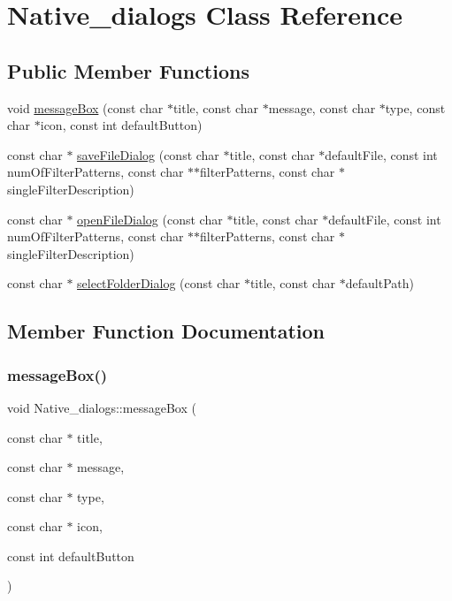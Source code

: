 \hypertarget{class_native__dialogs}{}\section{Native\+\_\+dialogs Class Reference}
\label{class_native__dialogs}
\subsection*{Public Member Functions}
\begin{DoxyCompactItemize}
\item 
void \hyperlink{class_native__dialogs_a325b62ac200ee9d8287a7320643d5385}{message\+Box} (const char $\ast$title, const char $\ast$message, const char $\ast$type, const char $\ast$icon, const int default\+Button)
\item 
const char $\ast$ \hyperlink{class_native__dialogs_a4bf815830a674dc34903d272391bcac3}{save\+File\+Dialog} (const char $\ast$title, const char $\ast$default\+File, const int num\+Of\+Filter\+Patterns, const char $\ast$$\ast$filter\+Patterns, const char $\ast$single\+Filter\+Description)
\item 
const char $\ast$ \hyperlink{class_native__dialogs_a57d8bdda43d74e367598bd5dc530b526}{open\+File\+Dialog} (const char $\ast$title, const char $\ast$default\+File, const int num\+Of\+Filter\+Patterns, const char $\ast$$\ast$filter\+Patterns, const char $\ast$single\+Filter\+Description)
\item 
const char $\ast$ \hyperlink{class_native__dialogs_a8bdf80cf55d1d5cf2835bc1b3e4084cc}{select\+Folder\+Dialog} (const char $\ast$title, const char $\ast$default\+Path)
\end{DoxyCompactItemize}


\subsection{Member Function Documentation}
\mbox{\label{class_native__dialogs_a325b62ac200ee9d8287a7320643d5385}} 
\subsubsection{\texorpdfstring{message\+Box()}{messageBox()}}
{\footnotesize\ttfamily void Native\+\_\+dialogs\+::message\+Box (\begin{DoxyParamCaption}\item[{const char $\ast$}]{title,  }\item[{const char $\ast$}]{message,  }\item[{const char $\ast$}]{type,  }\item[{const char $\ast$}]{icon,  }\item[{const int}]{default\+Button }\end{DoxyParamCaption})}

